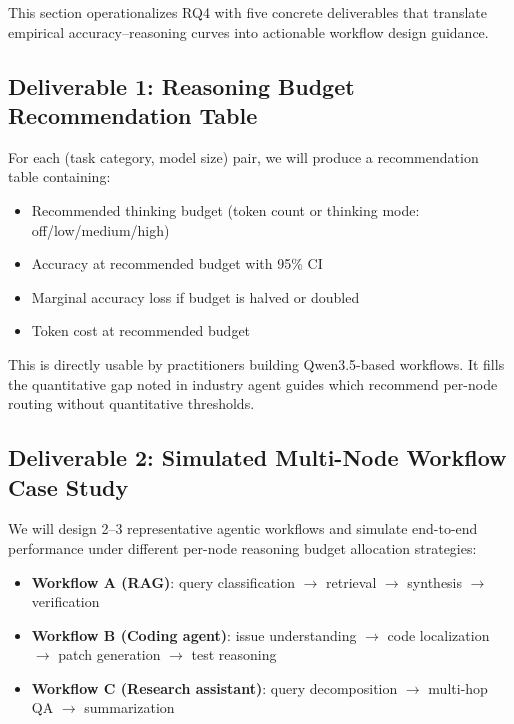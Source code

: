 \documentclass[11pt]{article}
\begin{document}
This section operationalizes RQ4 with five concrete deliverables that translate empirical accuracy--reasoning curves into actionable workflow design guidance.

\subsection{Deliverable 1: Reasoning Budget Recommendation Table}

For each (task category, model size) pair, we will produce a recommendation table containing:
\begin{itemize}[nosep]
    \item Recommended thinking budget (token count or thinking mode: off/low/medium/high)
    \item Accuracy at recommended budget with 95\% CI
    \item Marginal accuracy loss if budget is halved or doubled
    \item Token cost at recommended budget
\end{itemize}
This is directly usable by practitioners building Qwen3.5-based workflows. It fills the quantitative gap noted in industry agent guides \citep{anthropic2024agents,openai2025agents} which recommend per-node routing without quantitative thresholds.

\subsection{Deliverable 2: Simulated Multi-Node Workflow Case Study}

We will design 2--3 representative agentic workflows and simulate end-to-end performance under different per-node reasoning budget allocation strategies:

\begin{itemize}[nosep]
    \item \textbf{Workflow A (RAG)}: query classification $\rightarrow$ retrieval $\rightarrow$ synthesis $\rightarrow$ verification
    \item \textbf{Workflow B (Coding agent)}: issue understanding $\rightarrow$ code localization $\rightarrow$ patch generation $\rightarrow$ test reasoning
    \item \textbf{Workflow C (Research assistant)}: query decomposition $\rightarrow$ multi-hop QA $\rightarrow$ summarization
\end{itemize}
\end{document}
